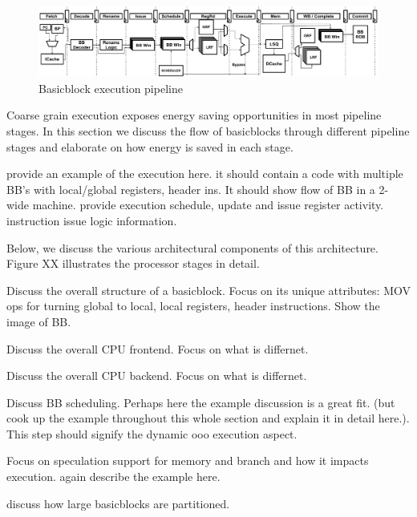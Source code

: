 \begin{figure}
	\centering
	\includegraphics[width=\textwidth]{fig/pipeline.pdf} 
	\caption{Basicblock execution pipeline}
	\label{fig:pipeline}
\end{figure}

Coarse grain execution exposes energy saving opportunities in most pipeline
stages. In this section we discuss the flow of basicblocks through different
pipeline stages and elaborate on how energy is saved in each stage.


provide an example of the execution here.  it should contain a code with
multiple BB's with local/global registers, header ins.  It should show flow of
BB in a 2-wide machine. provide execution schedule, update and issue register
activity. instruction issue logic information.

Below, we discuss the various architectural components of this architecture.
Figure XX illustrates the processor stages in detail.

Discuss the overall structure of a basicblock. Focus on its unique attributes:
MOV ops for turning global to local, local registers, header instructions. Show
the image of BB.


Discuss the overall CPU frontend. Focus on what is differnet.


Discuss the overall CPU backend. Focus on what is differnet.


Discuss BB scheduling. Perhaps here the example discussion is a great fit. (but
        cook up the example throughout this whole section and explain it in
        detail here.). This step should signify the dynamic ooo execution
aspect.


Focus on speculation support for memory and branch and how it impacts execution.
again describe the example here.


discuss how large basicblocks are partitioned.
